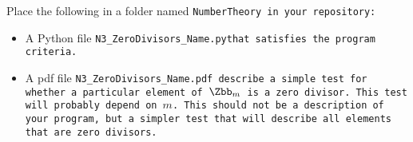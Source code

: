 \documentclass{article}
\newcommand\foldername{\tt{NumberTheory} }
\newcommand\filename{\tt{N3\_ZeroDivisors\_Name.py}\;\;}
\begin{document}
	
	Place the following in a folder named \foldername in your repository:
	\begin{itemize}
		\item A Python file \filename  that satisfies the program criteria.
		\item A pdf file \tt{N3\_ZeroDivisors\_Name.pdf} describe a simple test for whether a particular element of $\Zbb_m$ is  a zero divisor.  This test will probably depend on $m$.  This should not be a description of your program, but a simpler test that will describe all elements that are zero divisors.
	\end{itemize}

	
\end{document}
